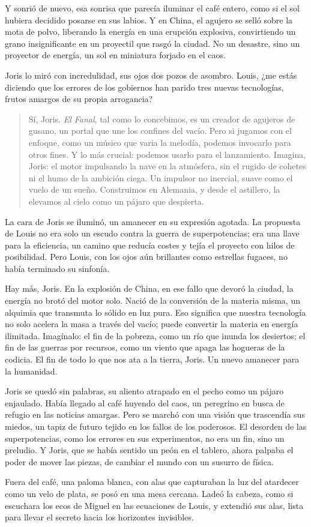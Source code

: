 Y sonrió de nuevo, esa sonrisa que parecía iluminar el café entero, como si el sol hubiera decidido posarse en sus labios. \glqq Y en China, el agujero se selló sobre la mota de polvo, liberando la energía en una erupción explosiva, convirtiendo un grano insignificante en un proyectil que rasgó la ciudad. No un desastre, sino un proyector de energía, un sol en miniatura forjado en el caos.\grqq

Joris lo miró con incredulidad, sus ojos dos pozos de asombro. \glqq Louis, ¿me estás diciendo que los errores de los gobiernos han parido tres nuevas tecnologías, frutos amargos de su propia arrogancia?\grqq

\begin{quote}
\calli
\glqq Sí, Joris. \emph{El Fanal}, tal como lo concebimos, es un creador de agujeros de gusano, un portal que une los confines del vacío. Pero si jugamos con el enfoque, como un músico que varia la melodía, podemos invocarlo para otros fines. Y lo más crucial: podemos usarlo para el lanzamiento. Imagina, Joris: el motor impulsando la nave en la atmósfera, sin el rugido de cohetes ni el humo de la ambición ciega. Un impulsor no inercial, suave como el vuelo de un sueño. Construimos en Alemania, y desde el astillero, la elevamos al cielo como un pájaro que despierta.\grqq
\end{quote}

La cara de Joris se iluminó, un amanecer en su expresión agotada. La propuesta de Louis no era solo un escudo contra la guerra de superpotencias; era una llave para la eficiencia, un camino que reducía costes y tejía el proyecto con hilos de posibilidad. Pero Louis, con los ojos aún brillantes como estrellas fugaces, no había terminado su sinfonía.

\glqq Hay más, Joris. En la explosión de China, en ese fallo que devoró la ciudad, la energía no brotó del motor solo. Nació de la conversión de la materia misma, un alquimia que transmuta lo sólido en luz pura. Eso significa que nuestra tecnología no solo acelera la masa a través del vacío; puede convertir la materia en energía ilimitada. Imagínalo: el fin de la pobreza, como un río que inunda los desiertos; el fin de las guerras por recursos, como un viento que apaga las hogueras de la codicia. El fin de todo lo que nos ata a la tierra, Joris. Un nuevo amanecer para la humanidad.\grqq

Joris se quedó sin palabras, su aliento atrapado en el pecho como un pájaro enjaulado. Había llegado al café huyendo del caos, un peregrino en busca de refugio en las noticias amargas. Pero se marchó con una visión que trascendía sus miedos, un tapiz de futuro tejido en los fallos de los poderosos. El desorden de las superpotencias, como los errores en sus experimentos, no era un fin, sino un preludio. Y Joris, que se había sentido un peón en el tablero, ahora palpaba el poder de mover las piezas, de cambiar el mundo con un susurro de física.

Fuera del café, una paloma blanca, con alas que capturaban la luz del atardecer como un velo de plata, se posó en una mesa cercana. Ladeó la cabeza, como si escuchara los ecos de Miguel en las ecuaciones de Louis, y extendió sus alas, lista para llevar el secreto hacia los horizontes invisibles.
